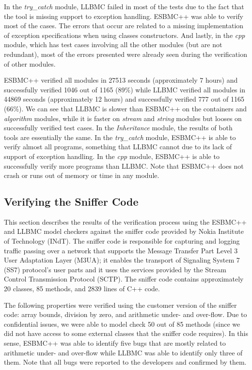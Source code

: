 \documentclass[conference]{IEEEtran}
\begin{document}
In the \textit{try\_catch} module, LLBMC failed in most of the tests due to the fact that
the tool is missing support to exception handling. ESBMC++ was able to verify most of the cases.
The errors that occur are related to a missing implementation of exception specifications when
using classes constructors. And lastly, in the \textit{cpp} module, which has test cases involving all
the other modules (but are not redundant), most of the errors presented were already seen during
the verification of other modules.

ESBMC++ verified all modules in 27513 seconds (approximately 7 hours)
and successfully verified 1046 out of 1165 (89\%) while LLBMC verified all modules
in 44869 seconds (approximately 12 hours) and successfully verified 777 out of 1165
(66\%). We can see that LLBMC is slower than ESBMC++ on the containers
and \textit{algorithm} modules, while it is faster on \textit{stream} and
\textit{string} modules but looses on successfully verified test cases.
In the \textit{Inheritance} module, the results of both tools are essentially the same.
In the \textit{try\_catch} module, ESBMC++ is able to verify almost all programs,
something that LLBMC cannot due to its lack of support of exception handling.
In the \textit{cpp} module, ESBMC++ is able to successfully verify more programs than LLBMC.
Note that ESBMC++ does not crash or runs out of memory or time in any module.

\subsection{Verifying the Sniffer Code}
\label{verifying-the-sniffer-code}

This section describes the results of the verification process using the 
ESBMC++ and LLBMC model checkers against the sniffer code provided by 
Nokia Institute of Technology (INdT). The sniffer code is responsible for 
capturing and logging traffic passing over a network that supports the Message 
Transfer Part Level 3 User Adaptation Layer (M3UA); it enables the transport of 
Signaling System 7 (SS7) protocol’s user parts and it uses the services provided
by the Stream Control Transmission Protocol (SCTP). The sniffer code contains 
approximately 20 classes, 85 methods, and 2839 lines of C++ code. 

The following properties were verified using the customer version 
of the sniffer code: array bounds, division by zero, and arithmetic under- 
and over-flow. Due to confidential issues, we were able to model check 
50 out of 85 methods (since we did not have access to some external classes that 
the sniffer code requires). In this sense, ESBMC++ was able to identify five bugs 
that are mostly related to arithmetic under- and over-flow while LLBMC was able to 
identify only three of them. Note that all bugs were reported to the developers 
and confirmed by them.
\end{document}
